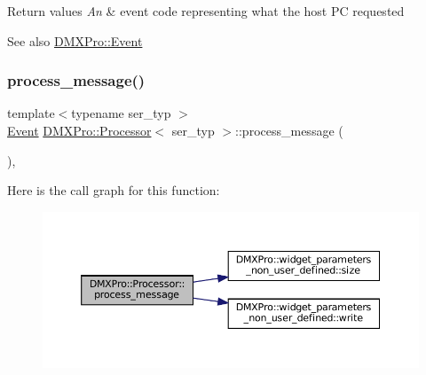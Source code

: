 \begin{DoxyRetVals}{Return values}
{\em An} & event code representing what the host PC requested \\
\hline
\end{DoxyRetVals}
\begin{DoxySeeAlso}{See also}
\hyperlink{namespaceDMXPro_a0b4335b3ed2abbd803e6d33c54d6ac6d}{D\+M\+X\+Pro\+::\+Event} 
\end{DoxySeeAlso}
\mbox{\label{classDMXPro_1_1Processor_a21c28c13ee050cabdaabc6d869137dcc}} 
\subsubsection{\texorpdfstring{process\+\_\+message()}{process\_message()}}
{\footnotesize\ttfamily template$<$typename ser\+\_\+typ $>$ \\
\hyperlink{namespaceDMXPro_a0b4335b3ed2abbd803e6d33c54d6ac6d}{Event} \hyperlink{classDMXPro_1_1Processor}{D\+M\+X\+Pro\+::\+Processor}$<$ ser\+\_\+typ $>$\+::process\+\_\+message (\begin{DoxyParamCaption}{ }\end{DoxyParamCaption})\hspace{0.3cm}{\ttfamily [inline]}, {\ttfamily [private]}}

Here is the call graph for this function\+:\nopagebreak
\begin{figure}[H]
\begin{center}
\leavevmode
\includegraphics[width=350pt]{classDMXPro_1_1Processor_a21c28c13ee050cabdaabc6d869137dcc_cgraph}
\end{center}
\end{figure}
\mbox{\label{classDMXPro_1_1Processor_a554484560a2dcc0d5763074a584074bb}} 
